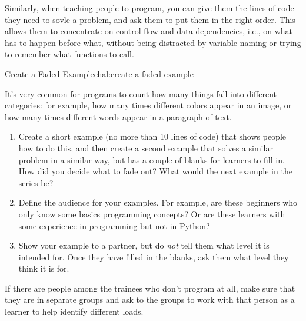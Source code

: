 Similarly, when teaching people to program, you can give them the
lines of code they need to sovle a problem, and ask them to put them
in the right order.  This allows them to concentrate on control flow
and data dependencies, i.e., on what has to happen before what,
without being distracted by variable naming or trying to remember what
functions to call.

\begin{challenge}{Create a Faded Example}{chal:create-a-faded-example}

It's very common for programs to count how many things fall into
different categories: for example, how many times different colors
appear in an image, or how many times different words appear in a
paragraph of text.

\begin{enumerate}

\item
  Create a short example (no more than 10 lines of code) that shows
  people how to do this, and then create a second example that solves
  a similar problem in a similar way, but has a couple of blanks for
  learners to fill in.  How did you decide what to fade out?  What
  would the next example in the series be?

\item
  Define the audience for your examples. For example, are these
  beginners who only know some basics programming concepts? Or are
  these learners with some experience in programming but not in
  Python?

\item
  Show your example to a partner, but do \emph{not} tell them what
  level it is intended for.  Once they have filled in the blanks, ask
  them what level they think it is for.

\end{enumerate}

If there are people among the trainees who don't program at all, make
sure that they are in separate groups and ask to the groups to work
with that person as a learner to help identify different loads.

\end{challenge}

